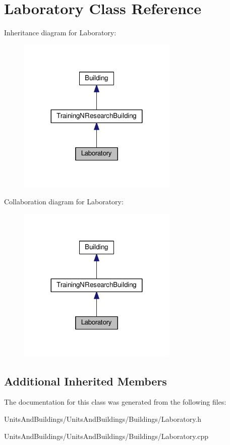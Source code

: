 \hypertarget{class_laboratory}{}\section{Laboratory Class Reference}
\label{class_laboratory}


Inheritance diagram for Laboratory\+:
\nopagebreak
\begin{figure}[H]
\begin{center}
\leavevmode
\includegraphics[width=215pt]{class_laboratory__inherit__graph}
\end{center}
\end{figure}


Collaboration diagram for Laboratory\+:
\nopagebreak
\begin{figure}[H]
\begin{center}
\leavevmode
\includegraphics[width=215pt]{class_laboratory__coll__graph}
\end{center}
\end{figure}
\subsection*{Additional Inherited Members}


The documentation for this class was generated from the following files\+:\begin{DoxyCompactItemize}
\item 
Units\+And\+Buildings/\+Units\+And\+Buildings/\+Buildings/Laboratory.\+h\item 
Units\+And\+Buildings/\+Units\+And\+Buildings/\+Buildings/Laboratory.\+cpp\end{DoxyCompactItemize}

